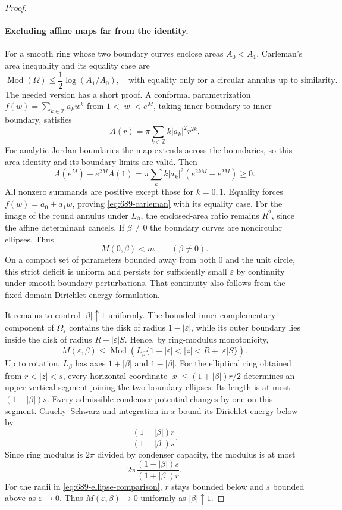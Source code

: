 \documentclass[11pt,a4paper]{article}
\theoremstyle{remark}
\begin{document}
\begin{proof}
\paragraph{Excluding affine maps far from the identity.}
For a smooth ring whose two boundary curves enclose areas $A_0<A_1$, Carleman's area inequality and its equality case are
\begin{equation}
 \operatorname{Mod}(\Omega)\le\frac12\log(A_1/A_0),
 \quad\text{with equality only for a circular annulus up to similarity.}
 \label{eq:689-carleman}
\end{equation}
The needed version has a short proof. A conformal parametrization
$f(w)=\sum_{k\in\mathbb Z}a_kw^k$ from $1<|w|<e^M$, taking inner boundary to inner boundary, satisfies
\[
 A(r)=\pi\sum_{k\in\mathbb Z}k|a_k|^2r^{2k}.
\]
For analytic Jordan boundaries the map extends across the boundaries, so this area identity and its boundary limits are valid. Then
\[
 A(e^M)-e^{2M}A(1)
 =\pi\sum_k k|a_k|^2(e^{2kM}-e^{2M})\ge0.
\]
All nonzero summands are positive except those for $k=0,1$. Equality forces $f(w)=a_0+a_1w$, proving \eqref{eq:689-carleman} with its equality case.
For the image of the round annulus under $L_\beta$, the enclosed-area ratio remains $R^2$, since the affine determinant cancels. If $\beta\ne0$ the boundary curves are noncircular ellipses. Thus
\begin{equation}
 M(0,\beta)<m\qquad(\beta\ne0).
 \label{eq:689-strict-affine-max}
\end{equation}
On a compact set of parameters bounded away from both $0$ and the unit circle, this strict deficit is uniform and persists for sufficiently small $\varepsilon$ by continuity under smooth boundary perturbations. That continuity also follows from the fixed-domain Dirichlet-energy formulation.

It remains to control $|\beta|\uparrow1$ uniformly. The bounded inner complementary component of $\Omega_\varepsilon$ contains the disk of radius $1-|\varepsilon|$, while its outer boundary lies inside the disk of radius $R+|\varepsilon|S$. Hence, by ring-modulus monotonicity,
\begin{equation}
 M(\varepsilon,\beta)
 \le\operatorname{Mod}\left(L_\beta
        \{1-|\varepsilon|<|z|<R+|\varepsilon|S\}\right).
 \label{eq:689-ellipse-comparison}
\end{equation}
Up to rotation, $L_\beta$ has axes $1+|\beta|$ and $1-|\beta|$. For the elliptical ring obtained from $r<|z|<s$, every horizontal coordinate
$|x|\le(1+|\beta|)r/2$ determines an upper vertical segment joining the two boundary ellipses. Its length is at most $(1-|\beta|)s$. Every admissible condenser potential changes by one on this segment. Cauchy--Schwarz and integration in $x$ bound its Dirichlet energy below by
\[
 \frac{(1+|\beta|)r}{(1-|\beta|)s}.
\]
Since ring modulus is $2\pi$ divided by condenser capacity, the modulus is at most
\[
 2\pi\frac{(1-|\beta|)s}{(1+|\beta|)r}.
\]
For the radii in \eqref{eq:689-ellipse-comparison}, $r$ stays bounded below and $s$ bounded above as $\varepsilon\to0$. Thus $M(\varepsilon,\beta)\to0$ uniformly as $|\beta|\uparrow1$.


\end{proof}
\end{document}

